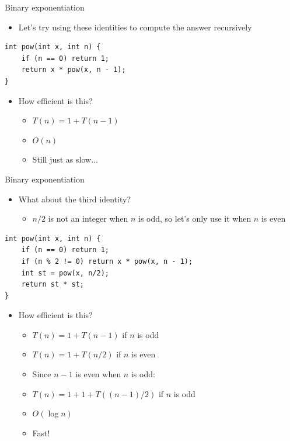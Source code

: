 \documentclass[10pt]{beamer}
\newcommand{\bi}{\begin{itemize}}
\newcommand{\ei}{\end{itemize}}
\begin{document}
\begin{frame}[fragile]{Binary exponentiation}
    \bi
        \item Let's try using these identities to compute the answer recursively
    \ei

    \vspace{10pt}

    \begin{verbatim}
int pow(int x, int n) {
    if (n == 0) return 1;
    return x * pow(x, n - 1);
}
    \end{verbatim}

    \vspace{10pt}

    \bi
        \item<2-> How efficient is this?
            \bi
                \item $T(n) = 1 + T(n-1)$
                \item<3-> $O(n)$
                \item<4-> Still just as slow...
            \ei
    \ei

\end{frame}

\begin{frame}[fragile]{Binary exponentiation}
    \bi
        \item What about the third identity?
            \bi
                \item $n/2$ is not an integer when $n$ is odd, so let's only use it when $n$ is even
            \ei
    \ei

    \begin{verbatim}
int pow(int x, int n) {
    if (n == 0) return 1;
    if (n % 2 != 0) return x * pow(x, n - 1);
    int st = pow(x, n/2);
    return st * st;
}
    \end{verbatim}

    \bi
        \item How efficient is this?
            \bi
                \item<2-> $T(n) = 1 + T(n-1)$ if $n$ is odd
                \item<2-> $T(n) = 1 + T(n/2)$ if $n$ is even
                \item<3-> Since $n-1$ is even when $n$ is odd:
                \item<3-> $T(n) = 1 + 1 + T((n-1)/2)$ if $n$ is odd
                \item<4-> $O(\log n)$
                \item<4-> Fast!
            \ei
    \ei
\end{frame}
\end{document}

